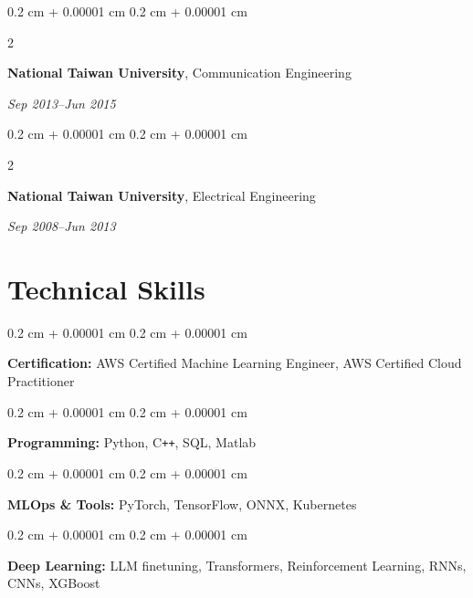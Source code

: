 \documentclass[10pt, letterpaper]{article}
\newenvironment{onecolentry}{
    \begin{adjustwidth}{
        0.2 cm + 0.00001 cm
    }{
        0.2 cm + 0.00001 cm
    }
}{
    \end{adjustwidth}
} %
\newenvironment{twocolentry}[2][]{
    \onecolentry
    \def\secondColumn{#2}
    \setcolumnwidth{\fill, 3.5 cm}
    \begin{paracol}{2}
}{
    \switchcolumn \raggedleft \secondColumn
    \end{paracol}
    \endonecolentry
} %
\begin{document}
        \vspace{0.05 cm}

        \begin{twocolentry}{
        {\small \textit{Sep 2013–Jun 2015}}}
                \textbf{National Taiwan University}, Communication Engineering
        \end{twocolentry}

        \vspace{0.05 cm}

        \begin{twocolentry}{
        {\small \textit{Sep 2008–Jun 2013}}}
               \textbf{National Taiwan University}, Electrical Engineering 
        \end{twocolentry}


        
    \section{Technical Skills}

        \begin{onecolentry}
            \textbf{Certification:} AWS Certified Machine Learning Engineer, AWS Certified Cloud Practitioner
        \end{onecolentry}

        \vspace{0.1 cm}
        
        \begin{onecolentry}
            \textbf{Programming:} Python, C\texttt{++}, SQL, Matlab
        \end{onecolentry}

        \vspace{0.1 cm}

        \begin{onecolentry}
            \textbf{MLOps \& Tools:} PyTorch, TensorFlow, ONNX, Kubernetes
        \end{onecolentry}

        \vspace{0.1 cm}

        \begin{onecolentry}
            \textbf{Deep Learning:} LLM finetuning, Transformers, Reinforcement Learning, RNNs, CNNs, XGBoost
        \end{onecolentry}
\end{document}

